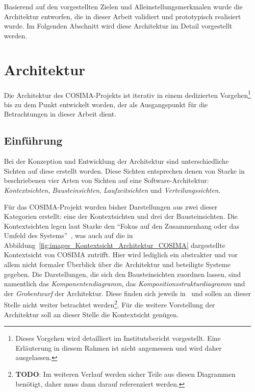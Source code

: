   Basierend auf den vorgestellten Zielen und Alleinstellungsmerkmalen wurde die Architektur entworfen, die in dieser Arbeit validiert und prototypisch realisiert wurde. Im Folgenden Abschnitt wird diese Architektur im Detail vorgestellt werden.


\section{Architektur} %
\label{sec:architektur}

  Die Architektur des COSIMA-Projekts ist iterativ in einem dedizierten Vorgehen\footnote{Dieses Vorgehen wird detailliert im Institutsbericht vorgestellt. Eine Erläuterung in diesem Rahmen ist nicht angemessen und wird daher ausgelassen.} bis zu dem Punkt entwickelt worden, der als Ausgangspunkt für die Betrachtungen in dieser Arbeit dient.

\subsection{Einführung} %
\label{sub:einfuehrung}

  Bei der Konzeption und Entwicklung der Architektur sind unterschiedliche Sichten auf diese erstellt worden. Diese Sichten entsprechen denen von Starke in~\citep[S. 83]{effektive_software_architekturen} beschriebenen vier Arten von Sichten auf eine Software-Architektur: \emph{Kontextsichten}, \emph{Bausteinsichten}, \emph{Laufzeitsichten} und \emph{Verteilungssichten}.

  Für das COSIMA-Projekt wurden bisher Darstellungen aus zwei dieser Kategorien erstellt: eine der Kontextsichten und drei der Bausteinsichten. Die Kontextsichten legen laut Starke den "`Fokus auf den Zusammenhang oder das Umfeld des Systems"'~\citep[S. 87]{effektive_software_architekturen}, was auch auf die in Abbildung~\ref{fig:images_Kontextsicht_Architektur_COSIMA} dargestellte Kontextsicht von COSIMA zutrifft. Hier wird lediglich ein abstrakter und vor allem nicht formaler Überblick über die Architektur und beteiligte Systeme gegeben. Die Darstellungen, die sich den Bausteinsichten zuordnen lassen, sind namentlich das \emph{Komponentendiagramm}, das \emph{Kompositionsstrukturdiagramm} und der \emph{Grobentwurf} der Architektur. Diese finden sich jeweils in~\citep{bericht} und sollen an dieser Stelle nicht weiter betrachtet werden\footnote{\textbf{TODO}: Im weiteren Verlauf werden sicher Teile aus diesen Diagrammen benötigt, daher muss dann darauf referenziert werden.}. Für die weitere Vorstellung der Architektur soll an dieser Stelle die Kontextsicht genügen.


